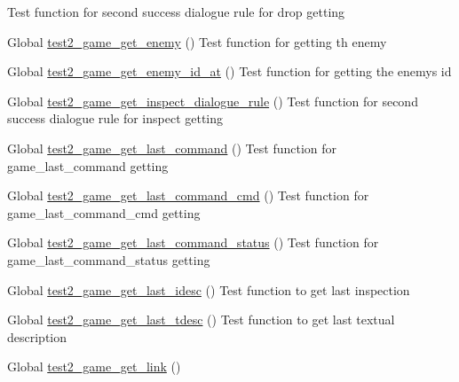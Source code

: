 \begin{DoxyRefList}
%
Test function for second success dialogue rule for drop getting  
\item[Global \mbox{\hyperlink{game__test_8c_ad6f07fd7f62e285680dd4651cdd81fe7}{test2\+\_\+game\+\_\+get\+\_\+enemy}} ()]\label{test__test000175}%
%
Test function for getting th enemy  
\item[Global \mbox{\hyperlink{game__test_8c_a9bde0f62c831c884e609c9adb646f09e}{test2\+\_\+game\+\_\+get\+\_\+enemy\+\_\+id\+\_\+at}} ()]\label{test__test000181}%
%
Test function for getting the enemy\textquotesingle{}s id  
\item[Global \mbox{\hyperlink{game__test_8c_aaa4755c4468a4e10c71e4584a01ffb49}{test2\+\_\+game\+\_\+get\+\_\+inspect\+\_\+dialogue\+\_\+rule}} ()]\label{test__test000352}%
%
Test function for second success dialogue rule for inspect getting  
\item[Global \mbox{\hyperlink{game__test_8c_ac6463a36d0a06d720225b64f894ec445}{test2\+\_\+game\+\_\+get\+\_\+last\+\_\+command}} ()]\label{test__test000268}%
%
Test function for game\+\_\+last\+\_\+command getting  
\item[Global \mbox{\hyperlink{game__test_8c_a49e4d6ac72bbe59b536f349eaf3698e3}{test2\+\_\+game\+\_\+get\+\_\+last\+\_\+command\+\_\+cmd}} ()]\label{test__test000270}%
%
Test function for game\+\_\+last\+\_\+command\+\_\+cmd getting  
\item[Global \mbox{\hyperlink{game__test_8c_a5ab56bee95585a22b05d60df46f200dd}{test2\+\_\+game\+\_\+get\+\_\+last\+\_\+command\+\_\+status}} ()]\label{test__test000273}%
%
Test function for game\+\_\+last\+\_\+command\+\_\+status getting  
\item[Global \mbox{\hyperlink{game__test_8c_ad4406354fb267410f482eeb3bc56299f}{test2\+\_\+game\+\_\+get\+\_\+last\+\_\+idesc}} ()]\label{test__test000283}%
%
Test function to get last inspection  
\item[Global \mbox{\hyperlink{game__test_8c_a6658fce137aed07bb566cd1679febd43}{test2\+\_\+game\+\_\+get\+\_\+last\+\_\+tdesc}} ()]\label{test__test000279}%
%
Test function to get last textual description  
\item[Global \mbox{\hyperlink{game__test_8c_a9d9fe90216f392c5cb61aff46555524f}{test2\+\_\+game\+\_\+get\+\_\+link}} ()]\label{test__test000231}%
%

\end{DoxyRefList}
